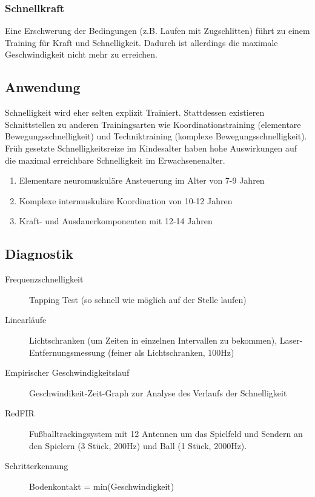 \subsubsection{Schnellkraft}
Eine Erschwerung der Bedingungen (z.B. Laufen mit Zugschlitten) führt zu einem Training für Kraft und Schnelligkeit.
Dadurch ist allerdings die maximale Geschwindigkeit nicht mehr zu erreichen.

\subsection{Anwendung}
Schnelligkeit wird eher selten explizit Trainiert.
Stattdessen existieren Schnittstellen zu anderen Trainingsarten wie Koordinationstraining (elementare Bewegungsschnelligkeit) und Techniktraining (komplexe Bewegungsschnelligkeit).\\
Früh gesetzte Schnelligkeitsreize im Kindesalter haben hohe Auswirkungen auf die maximal erreichbare Schnelligkeit im Erwachsenenalter.
\begin{enumerate}
    \item Elementare neuromuskuläre Ansteuerung im Alter von 7-9 Jahren
    \item Komplexe intermuskuläre Koordination von 10-12 Jahren
    \item Kraft- und Ausdauerkomponenten mit 12-14 Jahren
\end{enumerate}

\subsection{Diagnostik}
\begin{description}
    \item[Frequenzschnelligkeit] Tapping Test (so schnell wie möglich auf der Stelle laufen)
    \item[Linearläufe] Lichtschranken (um Zeiten in einzelnen Intervallen zu bekommen), Laser-Entfernungsmessung (feiner als Lichtschranken, 100Hz)
    \item[Empirischer Geschwindigkeitslauf] Geschwindikeit-Zeit-Graph zur Analyse des Verlaufs der Schnelligkeit
    \item[RedFIR] Fußballtrackingsystem mit 12 Antennen um das Spielfeld und Sendern an den Spielern (3 Stück, 200Hz) und Ball (1 Stück, 2000Hz).
    \item[Schritterkennung] Bodenkontakt = min(Geschwindigkeit)
\end{description}
